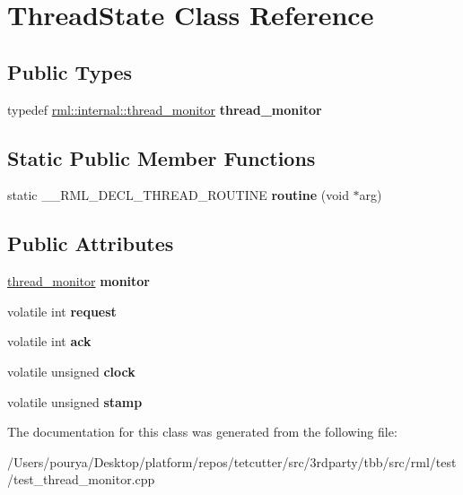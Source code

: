 \hypertarget{classThreadState}{}\section{Thread\+State Class Reference}
\label{classThreadState}
\subsection*{Public Types}
\begin{DoxyCompactItemize}
\item 
\hypertarget{classThreadState_af3cb5401a0a2a69a24093740b976f166}{}typedef \hyperlink{classrml_1_1internal_1_1thread__monitor}{rml\+::internal\+::thread\+\_\+monitor} {\bfseries thread\+\_\+monitor}\label{classThreadState_af3cb5401a0a2a69a24093740b976f166}

\end{DoxyCompactItemize}
\subsection*{Static Public Member Functions}
\begin{DoxyCompactItemize}
\item 
\hypertarget{classThreadState_a9205bcce6760a4f0baf856f6bc30a68f}{}static \+\_\+\+\_\+\+R\+M\+L\+\_\+\+D\+E\+C\+L\+\_\+\+T\+H\+R\+E\+A\+D\+\_\+\+R\+O\+U\+T\+I\+N\+E {\bfseries routine} (void $\ast$arg)\label{classThreadState_a9205bcce6760a4f0baf856f6bc30a68f}

\end{DoxyCompactItemize}
\subsection*{Public Attributes}
\begin{DoxyCompactItemize}
\item 
\hypertarget{classThreadState_a01ab646ccc8443d5ac4852d81444793a}{}\hyperlink{classrml_1_1internal_1_1thread__monitor}{thread\+\_\+monitor} {\bfseries monitor}\label{classThreadState_a01ab646ccc8443d5ac4852d81444793a}

\item 
\hypertarget{classThreadState_a543833fa5660ad2f2aea500d0cd720d3}{}volatile int {\bfseries request}\label{classThreadState_a543833fa5660ad2f2aea500d0cd720d3}

\item 
\hypertarget{classThreadState_a10b67d3a323043d86dde0c21f22778a6}{}volatile int {\bfseries ack}\label{classThreadState_a10b67d3a323043d86dde0c21f22778a6}

\item 
\hypertarget{classThreadState_a654246d47f5e7bcaf2f1e1f57557d5e4}{}volatile unsigned {\bfseries clock}\label{classThreadState_a654246d47f5e7bcaf2f1e1f57557d5e4}

\item 
\hypertarget{classThreadState_a07ba8ae6efd4aa3960ab7f882bbc701b}{}volatile unsigned {\bfseries stamp}\label{classThreadState_a07ba8ae6efd4aa3960ab7f882bbc701b}

\end{DoxyCompactItemize}


The documentation for this class was generated from the following file\+:\begin{DoxyCompactItemize}
\item 
/\+Users/pourya/\+Desktop/platform/repos/tetcutter/src/3rdparty/tbb/src/rml/test/test\+\_\+thread\+\_\+monitor.\+cpp\end{DoxyCompactItemize}

